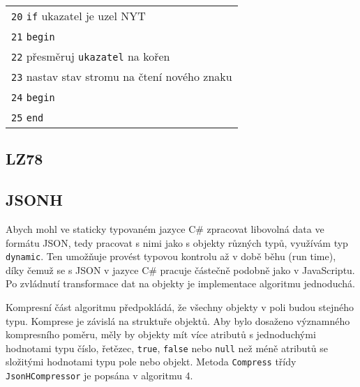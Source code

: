 \begin{table}[!h]
\begin{tabular}{|l|}
\texttt{20} \hspace*{5mm}\texttt{if} ukazatel je uzel NYT\\
\texttt{21} \hspace*{5mm}\texttt{begin}\\
\texttt{22} \hspace*{10mm}přesměruj \texttt{ukazatel} na kořen\\
\texttt{23} \hspace*{10mm}nastav stav stromu na čtení nového znaku\\
\texttt{24} \hspace*{5mm}\texttt{begin}\\
\texttt{25} \texttt{end}\\
\hline
\end{tabular}
\end{table}

\subsection{LZ78}

\subsection{JSONH}
Abych mohl ve staticky typovaném jazyce C\# zpracovat libovolná data ve formátu JSON, tedy pracovat s nimi jako s objekty různých typů, využívám typ \texttt{dynamic}. Ten umožňuje provést typovou kontrolu až v době běhu (run time), díky čemuž se s JSON v jazyce C\# pracuje částečně podobně jako v JavaScriptu. Po zvládnutí transformace dat na objekty je implementace algoritmu jednoduchá.

Kompresní část algoritmu předpokládá, že všechny objekty v poli budou stejného typu. Komprese je závislá na struktuře objektů. Aby bylo dosaženo významného kompresního poměru, měly by objekty mít více atributů s jednoduchými hodnotami typu číslo, řetězec, \texttt{true}, \texttt{false} nebo \texttt{null} než méně atributů se složitými hodnotami typu pole nebo objekt. Metoda \texttt{Compress} třídy \texttt{JsonHCompressor} je popsána v algoritmu 4.

